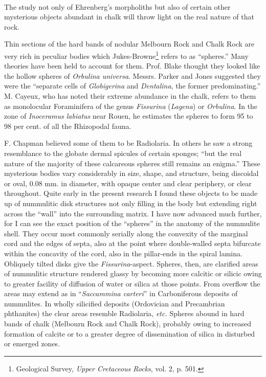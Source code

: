 \documentclass[a4paper, 12pt, oneside, landscape]{article}
\begin{document}
\paragraph{}
The study not only of Ehrenberg's morpholiths but also of certain other mysterious objects abundant in chalk will throw light on the real nature of that rock.

Thin sections of the hard bands of nodular Melbourn Rock and Chalk Rock are very rich in peculiar bodies which Jukes-Browne\footnote{Geological Survey, \emph{Upper Cretaceous Rocks}, vol. 2, p. 501.} refers to as ``spheres.'' Many theories have been held to account for them. Prof. Blake thought they looked like the hollow spheres of \emph{Orbulina universa}. Messrs. Parker and Jones suggested they were the ``separate cells of \emph{Globigerina} and \emph{Dentalina}, the former predominating.'' M. Cayeux, who has noted their extreme abundance in the chalk, refers to them as monolocular Foraminifera of the genus \emph{Fissurina} (\emph{Lagena}) or \emph{Orbulina}. In the zone of \emph{Inoceramus labiatus} near Rouen, he estimates the spheres to form 95 to 98 per cent. of all the Rhizopodal fauna.

F. Chapman believed some of them to be Radiolaria. In others he saw a strong resemblance to the globate dermal spicules of certain sponges; ``but the real nature of the majority of these calcareous spheres still remains an enigma.'' These mysterious bodies vary considerably in size, shape, and structure, being discoidal or oval, 0.08 mm. in diameter, with opaque center and clear periphery, or clear throughout. Quite early in the present research I found these objects to be made up of nummulitic disk structures not only filling in the body but extending right across the ``wall'' into the surrounding matrix. I have now advanced much further, for I can see the exact position of the ``spheres'' in the anatomy of the nummulite shell. They occur most commonly serially along the convexity of the marginal cord and the edges of septa, also at the point where double-walled septa bifurcate within the concavity of the cord, also in the pillar-ends in the spiral lamina. Obliquely tilted disks give the \emph{Fissurina}-aspect. Spheres, then, are clarified areas of nummulitic structure rendered glassy by becoming more calcitic or silicic owing to greater facility of diffusion of water or silica at those points. From overflow the areas may extend as in ``\emph{Saccammina carteri}'' in Carboniferous deposits of nummulites. In wholly silicified deposits (Ordovician and Precambrian phthanites) the clear areas resemble Radiolaria, \emph{etc.} Spheres abound in hard bands of chalk (Melbourn Rock and Chalk Rock), probably owing to increased formation of calcite or to a greater degree of dissemination of silica in disturbed or emerged zones.
\end{document}

